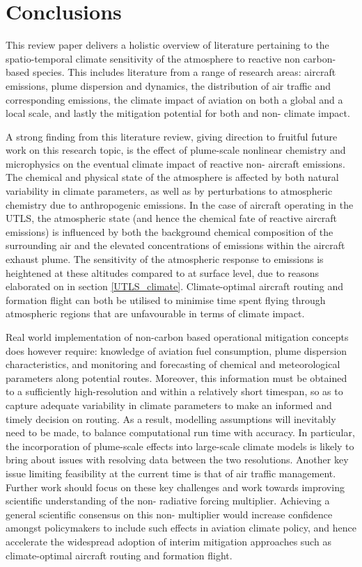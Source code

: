 \section{Conclusions}
This review paper delivers a holistic overview of literature pertaining to the spatio-temporal climate sensitivity of the atmosphere to reactive non carbon-based species. This includes literature from a range of research areas: aircraft emissions, plume dispersion and dynamics, the distribution of air traffic and corresponding emissions, the climate impact of aviation on both a global and a local scale, and lastly the mitigation potential for both  and non- climate impact. 

A strong finding from this literature review, giving direction to fruitful future work on this research topic, is the effect of plume-scale nonlinear chemistry and microphysics on the eventual climate impact of reactive non- aircraft emissions. The chemical and physical state of the atmosphere is affected by both natural variability in climate parameters, as well as by perturbations to atmospheric chemistry due to anthropogenic emissions. In the case of aircraft operating in the UTLS, the atmospheric state (and hence the chemical fate of reactive aircraft emissions) is influenced by both the background chemical composition of the surrounding air and the elevated concentrations of emissions within the aircraft exhaust plume. The sensitivity of the atmospheric response to emissions is heightened at these altitudes compared to at surface level, due to reasons elaborated on in section \ref{UTLS_climate}. Climate-optimal aircraft routing and formation flight can both be utilised to minimise time spent flying through atmospheric regions that are unfavourable in terms of climate impact.

Real world implementation of non-carbon based operational mitigation concepts does however require: knowledge of aviation fuel consumption, plume dispersion characteristics, and monitoring and forecasting of chemical and meteorological parameters along potential routes. Moreover, this information must be obtained to a sufficiently high-resolution and within a relatively short timespan, so as to capture adequate variability in climate parameters to make an informed and timely decision on routing. As a result, modelling assumptions will inevitably need to be made, to balance computational run time with accuracy. In particular, the incorporation of plume-scale effects into large-scale climate models is likely to bring about issues with resolving data between the two resolutions. Another key issue limiting feasibility at the current time is that of air traffic management. Further work should focus on these key challenges and work towards improving scientific understanding of the non- radiative forcing multiplier. Achieving a general scientific consensus on this non- multiplier would increase confidence amongst policymakers to include such effects in aviation climate policy, and hence accelerate the widespread adoption of interim mitigation approaches such as climate-optimal aircraft routing and formation flight.

